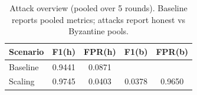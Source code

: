 \begin{table}[!t]
\centering
\caption{Attack overview (pooled over 5 rounds). Baseline reports pooled metrics; attacks report honest vs Byzantine pools.}
\label{tab:attack_overview}
\footnotesize
\setlength{\tabcolsep}{3.2pt}
\renewcommand{\arraystretch}{1.05}
\begin{tabular}{lcccc}
\toprule
\textbf{Scenario} & \textbf{F1(h)} & \textbf{FPR(h)} & \textbf{F1(b)} & \textbf{FPR(b)}\\
\midrule
Baseline & 0.9441 & 0.0871 &  &  \\
Scaling & 0.9745 & 0.0403 & 0.0378 & 0.9650 \\
\bottomrule
\end{tabular}
\end{table}
